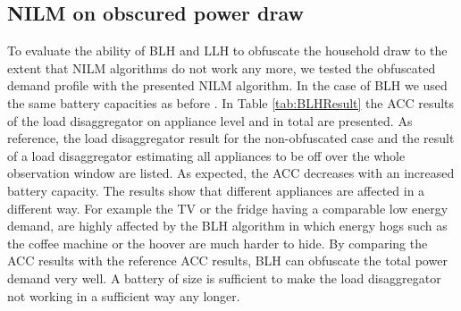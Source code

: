 \documentclass{article}
\begin{document}
\subsection{\ac{NILM} on obscured power draw}
To evaluate the ability of \ac{BLH} and \ac{LLH} to obfuscate the household draw to the extent that NILM algorithms do not work any more, we tested the obfuscated demand profile with the presented \ac{NILM} algorithm.
In the case of \ac{BLH} we used the same battery capacities as before .
In Table \ref{tab:BLHResult} the \ac{ACC} results of the load disaggregator on appliance level and in total are presented. 
As reference, the load disaggregator result for the non-obfuscated case and the
result of a load disaggregator estimating all appliances to be off over the whole observation window are listed.
As expected, the \ac{ACC} decreases with an increased battery capacity. 
The results show that different appliances are affected in a different way. 
For example the TV or the fridge having a comparable low energy demand, are highly affected by the \ac{BLH} algorithm in which energy hogs such as the coffee machine or the hoover are much harder to hide.
By comparing the \ac{ACC} results with the reference \ac{ACC} results, \ac{BLH} can obfuscate the total power demand very well.
A battery of size  is sufficient to make the load disaggregator not working in a sufficient way any longer.
\end{document}
